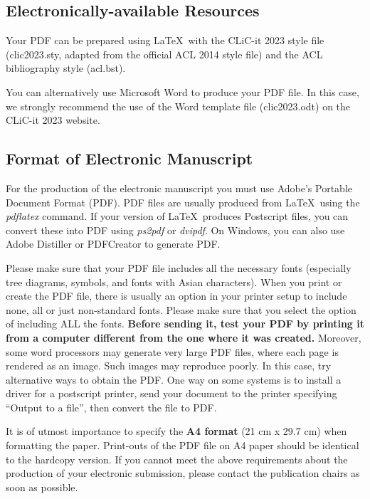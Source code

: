 \documentclass[11pt]{article}
\begin{document}
\subsection{Electronically-available Resources}

Your PDF can be prepared using  \LaTeX\ with
the CLiC-it 2023 style file (clic2023.sty, adapted 
from the  official ACL 2014 style  file) and the 
ACL bibliography style (acl.bst). 

{You can alternatively use Microsoft Word 
to produce your PDF file. In this case, we strongly
recommend the use of the Word template file
(clic2023.odt) on the CLiC-it 2023 website. }



\subsection{Format of Electronic Manuscript}
\label{sect:pdf}

For the production of the electronic manuscript you must use Adobe's
Portable Document Format (PDF). PDF files are usually produced from
\LaTeX\ using the \textit{pdflatex} command. If your version of
\LaTeX\ produces Postscript files, you can convert these into PDF
using \textit{ps2pdf} or \textit{dvipdf}. On Windows, you can also use
Adobe Distiller or PDFCreator to generate PDF.

Please make sure that your PDF file includes all the necessary fonts
(especially tree diagrams, symbols, and fonts with Asian
characters). When you print or create the PDF file, there is usually
an option in your printer setup to include none, all or just
non-standard fonts.  Please make sure that you select the option of
including ALL the fonts. \textbf{Before sending it, test your PDF by
  printing it from a computer different from the one where it was
  created.} Moreover, some word processors may generate very large PDF
files, where each page is rendered as an image. Such images may
reproduce poorly. In this case, try alternative ways to obtain the
PDF. One way on some systems is to install a driver for a postscript
printer, send your document to the printer specifying ``Output to a
file'', then convert the file to PDF.

It is of utmost importance to specify the \textbf{A4 format} (21 cm
x 29.7 cm) when formatting the paper. Print-outs of the PDF file on A4 
paper should be identical to the hardcopy version. If you cannot 
meet the above requirements about the production of your 
electronic submission, please contact the publication chairs 
as soon as possible.
\end{document}
